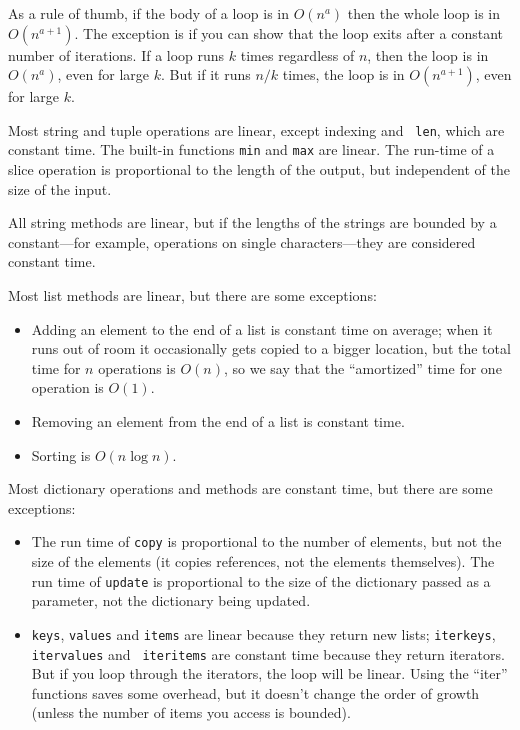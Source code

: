 \documentclass[10pt]{book}
\begin{document}
As a rule of thumb, if the body of a loop is in $O(n^a)$ then
the whole loop is in $O(n^{a+1})$.  The exception is if you can
show that the loop exits after a constant number of iterations.
If a loop runs $k$ times regardless of $n$, then
the loop is in $O(n^a)$, even for large $k$.  But if it runs
$n / k$ times, the loop is in $O(n^{a+1})$, even for large $k$.

Most string and tuple operations are linear, except indexing and {\tt
  len}, which are constant time.  The built-in functions {\tt min} and
{\tt max} are linear.  The run-time of a slice operation is
proportional to the length of the output, but independent of the size
of the input.

All string methods are linear, but if the lengths of
the strings are bounded by a constant---for example, operations on single
characters---they are considered constant time.

Most list methods are linear, but there are some exceptions:

\begin{itemize}

\item Adding an element to the end of a list is constant time on
average; when it runs out of room it occasionally gets copied
to a bigger location, but the total time for $n$ operations
is $O(n)$, so we say that the ``amortized'' time for one
operation is $O(1)$.

\item Removing an element from the end of a list is constant time.

\item Sorting is $O(n \log n)$.

\end{itemize}

Most dictionary operations and methods are constant time, but
there are some exceptions:

\begin{itemize}

\item The run time of {\tt copy} is proportional to the number of
  elements, but not the size of the elements (it copies references,
  not the elements themselves).  The run time of {\tt update} is
  proportional to the size of the dictionary passed as a parameter,
  not the dictionary being updated.

\item {\tt keys}, {\tt values} and {\tt items} are linear because they
  return new lists; {\tt iterkeys}, {\tt itervalues} and {\tt
    iteritems} are constant time because they return iterators.  But
  if you loop through the iterators, the loop will be linear.  Using
  the ``iter'' functions saves some overhead, but it doesn't change
  the order of growth (unless the number of items you access is
  bounded).

\end{itemize}
\end{document}
